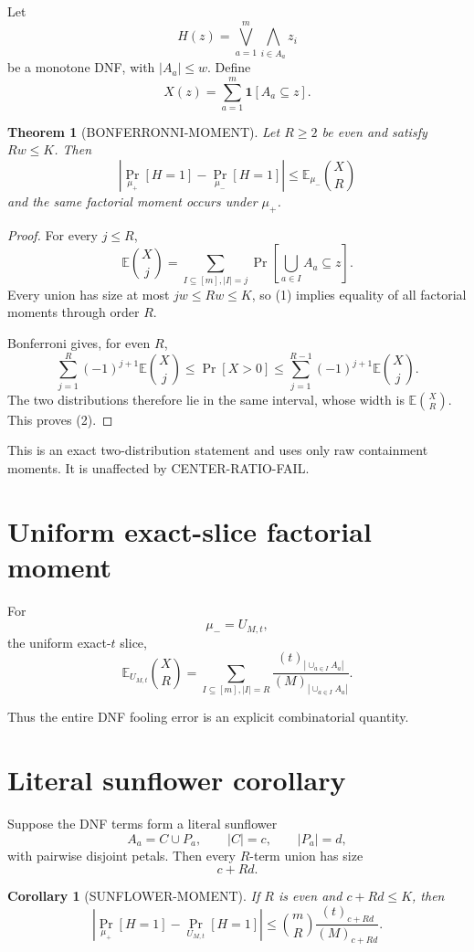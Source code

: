 \documentclass[11pt]{article}
\newtheorem{theorem}{Theorem}
\newtheorem{corollary}{Corollary}
\begin{document}
Let
\[
H(z)=\bigvee_{a=1}^m \bigwedge_{i\in A_a} z_i
\]
be a monotone DNF, with \(|A_a|\le w\).  Define
\[
X(z)=\sum_{a=1}^m
\mathbf 1[A_a\subseteq z].
\]

\begin{theorem}[BONFERRONNI-MOMENT]
Let \(R\ge2\) be even and satisfy \(Rw\le K\).  Then
\[
\boxed{
\left|
\Pr_{\mu_+}[H=1]
-
\Pr_{\mu_-}[H=1]
\right|
\le
\mathbb E_{\mu_-}\binom XR
}
\tag{2}
\]
and the same factorial moment occurs under \(\mu_+\).
\end{theorem}

\begin{proof}
For every \(j\le R\),
\[
\mathbb E\binom Xj
=
\sum_{I\subseteq[m], |I|=j}
\Pr\left[
\bigcup_{a\in I}A_a\subseteq z
\right].
\]
Every union has size at most \(jw\le Rw\le K\), so (1) implies equality
of all factorial moments through order \(R\).

Bonferroni gives, for even \(R\),
\[
\sum_{j=1}^{R}(-1)^{j+1}\mathbb E\binom Xj
\le
\Pr[X>0]
\le
\sum_{j=1}^{R-1}(-1)^{j+1}\mathbb E\binom Xj.
\]
The two distributions therefore lie in the same interval, whose width is
\(\mathbb E\binom XR\).  This proves (2).
\end{proof}

This is an exact two-distribution statement and uses only raw containment
moments.  It is unaffected by CENTER-RATIO-FAIL.

\section{Uniform exact-slice factorial moment}

For
\[
\mu_-=U_{M,t},
\]
the uniform exact-\(t\) slice,
\[
\mathbb E_{U_{M,t}}\binom XR
=
\sum_{I\subseteq[m], |I|=R}
\frac{(t)_{|\cup_{a\in I}A_a|}}
{(M)_{|\cup_{a\in I}A_a|}}.
\tag{3}
\]

Thus the entire DNF fooling error is an explicit combinatorial quantity.

\section{Literal sunflower corollary}

Suppose the DNF terms form a literal sunflower
\[
A_a=C\cup P_a,
\qquad
|C|=c,
\qquad
|P_a|=d,
\]
with pairwise disjoint petals.  Then every \(R\)-term union has size
\[
c+Rd.
\]

\begin{corollary}[SUNFLOWER-MOMENT]
If \(R\) is even and \(c+Rd\le K\), then
\[
\boxed{
\left|
\Pr_{\mu_+}[H=1]
-
\Pr_{U_{M,t}}[H=1]
\right|
\le
\binom mR
\frac{(t)_{c+Rd}}{(M)_{c+Rd}}
}.
\tag{4}
\]
\end{corollary}
\end{document}
